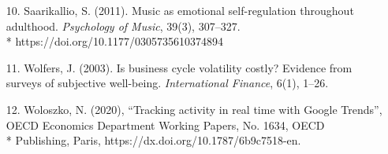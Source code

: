 \documentclass[12pt]{article}
\begin{document}
\begin{itemize}
	\item[10.] Saarikallio, S. (2011). Music as emotional self-regulation throughout adulthood. \textit{Psychology of Music}, 39(3), 307–327. \\*
	https://doi.org/10.1177/0305735610374894
	
	\item[11.] Wolfers, J. (2003). Is business cycle volatility costly? Evidence from surveys of subjective well-being. \textit{International Finance}, 6(1), 1–26.
	
	\item[12.] Woloszko, N. (2020), “Tracking activity in real time with Google Trends”, OECD Economics Department Working Papers, No. 1634, OECD \\*
	Publishing, Paris, 	https://dx.doi.org/10.1787/6b9c7518-en.
	
	
	
\end{itemize}
\end{document}
